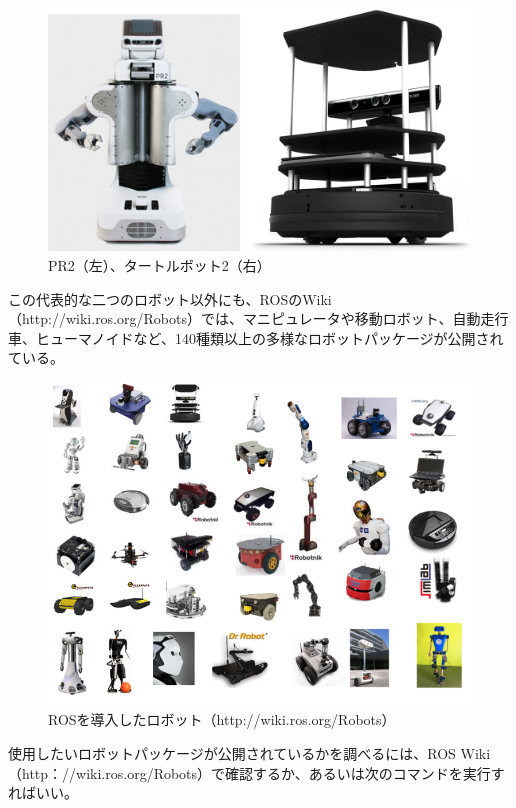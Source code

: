 \begin{figure}[htp]
  \centering
  \includegraphics[width=\columnwidth]{pictures/chapter7/pic_07_01.png}
  \caption{ PR2（左）、タートルボット2（右）}
\end{figure}


この代表的な二つのロボット以外にも、ROSのWiki（http://wiki.ros.org/Robots）では、マニピュレータや移動ロボット、自動走行車、ヒューマノイドなど、140種類以上の多様なロボットパッケージが公開されている。

\begin{figure}[htp]
  \centering
  \includegraphics[width=\columnwidth]{pictures/chapter7/pic_07_02.png}
  \caption{ROSを導入したロボット（http://wiki.ros.org/Robots）}
\end{figure}

使用したいロボットパッケージが公開されているかを調べるには、ROS Wiki（http：//wiki.ros.org/Robots）で確認するか、あるいは次のコマンドを実行すればいい。

